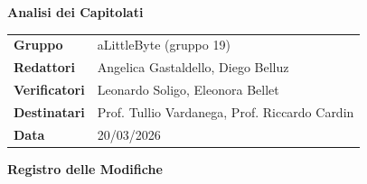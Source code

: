 \documentclass[a4paper,12pt]{article}
\begin{document}
\thispagestyle{firstpage}

\vspace*{0.5cm}

\begin{center}
    {\LARGE \textbf{Analisi dei Capitolati}}
\end{center}

\vspace{1.5cm}

\begin{center}
    \renewcommand{\arraystretch}{1.3}
    \begin{tcolorbox}[
        width=0.92\textwidth,
        colback=gray!6,
        colframe=gray!45,
        boxrule=0.5pt,
        arc=2mm,
        boxsep=0pt,
        left=8pt, right=8pt, top=8pt, bottom=8pt
    ]
        \begin{tabularx}{\linewidth}{>{\bfseries}p{3.5cm} X}
            Gruppo      & aLittleByte (gruppo 19) \\
            Redattori   & Angelica Gastaldello, Diego Belluz \\
            Verificatori& Leonardo Soligo, Eleonora Bellet\\
            Destinatari & Prof. Tullio Vardanega, Prof. Riccardo Cardin \\
            Data        & 20/03/2026 \\
        \end{tabularx}
    \end{tcolorbox}
\end{center}

\newpage


\begin{center}
    {\Large \textbf{Registro delle Modifiche}}
\end{center}

\vspace{0.35cm}
\end{document}
